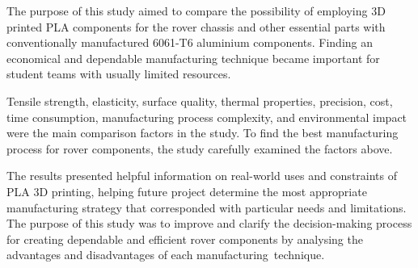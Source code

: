 The purpose of this study aimed to compare the possibility of employing 3D printed PLA components for the rover chassis and other essential parts with conventionally manufactured 6061-T6 aluminium components. Finding an economical and dependable manufacturing technique became important for student teams with usually limited resources.

Tensile strength, elasticity, surface quality, thermal properties, precision, cost, time consumption, manufacturing process complexity, and environmental impact were the main comparison factors in the study. To find the best manufacturing process for rover components, the study carefully examined the factors above.

The results presented helpful information on real-world uses and constraints of PLA 3D printing, helping future project determine the most appropriate manufacturing strategy that corresponded with particular needs and limitations. The purpose of this study was to improve and clarify the decision-making process for creating dependable and efficient rover components by analysing the advantages and disadvantages of each manufacturing technique.